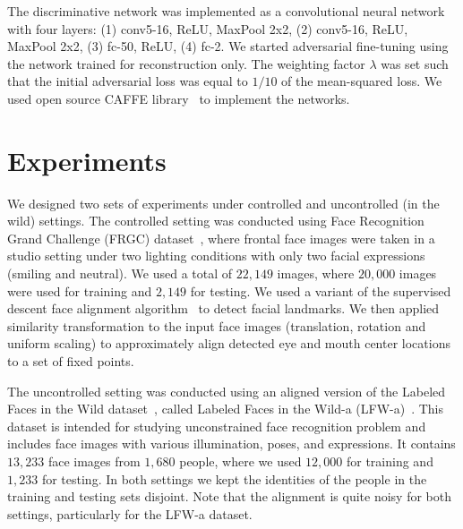 \documentclass[runningheads]{llncs}
\begin{document}
The discriminative network was implemented as a convolutional neural network with four layers: (1) conv5-16, ReLU, MaxPool 2x2, (2)  conv5-16, ReLU,  MaxPool 2x2, (3) fc-50, ReLU, (4) fc-2. We started adversarial fine-tuning using the network trained for reconstruction only. The weighting factor $\lambda$ was set such that the initial adversarial loss was equal to $1/10$ of the mean-squared loss. We used open source CAFFE library~\cite{jia2014caffe} to implement the networks.









\section{Experiments} \label{sec:Exp}



We designed two sets of experiments under controlled and uncontrolled (in the wild) settings. The controlled setting was conducted using Face Recognition Grand Challenge (FRGC) dataset~\cite{phillips2005overview}, where frontal face images were taken in a studio setting under two lighting conditions with only two facial expressions (smiling and neutral). We used a total of $22,149$ images, where $20,000$ images were used for training and $2,149$ for testing. We used a variant of the supervised descent face alignment algorithm~\cite{xiong2013supervised} to detect facial landmarks. We then applied similarity transformation to the input face images (translation, rotation and uniform scaling) to approximately align detected eye and mouth center locations to a set of fixed points.



The uncontrolled setting was conducted using an aligned version of the Labeled Faces in the Wild dataset~\cite{huang2007labeled}, called Labeled Faces in the Wild-a (LFW-a)~\cite{wolf2011effective}. This dataset is intended for studying unconstrained face recognition problem and includes face images with various illumination, poses, and expressions. It contains $13,233$ face images from $1,680$ people, where we used $12,000$ for training and $1,233$ for testing.
In both settings we kept the identities of the people in the training and testing sets disjoint. Note that the alignment is quite noisy for both settings, particularly for the LFW-a dataset.
\end{document}
